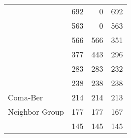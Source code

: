 \begin{tabular}{lrrr}
                            \citet{Gagne2018b}  &                692 &                 0 &                   692 \\
                            \citet{Ujjwal2020}  &                563 &                 0 &                   563 \\
                             \citet{Gagne2020}  &                566 &               566 &                   351 \\
                      \citet{EsplinLuhman2019}  &                377 &               443 &                   296 \\
                     \citet{Roccatagliata2020}  &                283 &               283 &                   232 \\
                          \citet{Meingast2019}  &                238 &               238 &                   238 \\
                 \citet{Furnkranz2019} Coma-Ber &                214 &               214 &                   213 \\
           \citet{Furnkranz2019} Neighbor Group &                177 &               177 &                   167 \\
                             \citet{Kraus2014}  &                145 &               145 &                   145 \\
\bottomrule
\end{tabular}
